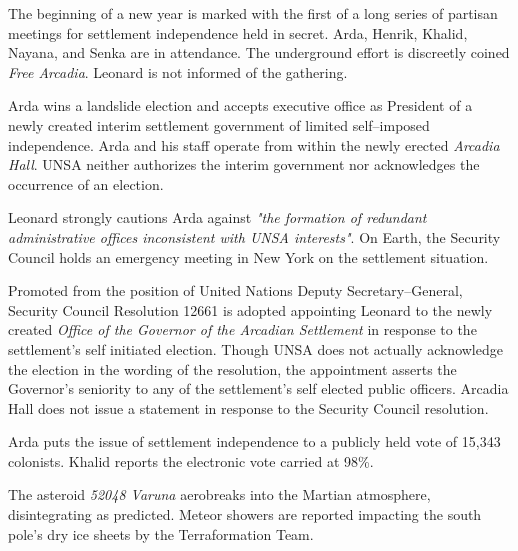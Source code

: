 

The beginning of a new year is marked with the first of a long series of partisan meetings for settlement independence held in secret. Arda, Henrik, Khalid, Nayana, and Senka are in attendance. The underground effort is discreetly coined {\it Free Arcadia}. Leonard is not informed of the gathering.
\StopTimelineDate

Arda wins a landslide election and accepts executive office as President of a newly created interim settlement government of limited self--imposed independence. Arda and his staff operate from within the newly erected {\it Arcadia Hall}. UNSA neither authorizes the interim government nor acknowledges the occurrence of an election.

Leonard strongly cautions Arda against {\it "the formation of redundant administrative offices inconsistent with UNSA interests"}. On Earth, the Security Council holds an emergency meeting in New York on the settlement situation.
\StopTimelineDate

Promoted from the position of United Nations Deputy Secretary--General, Security Council Resolution 12661 is adopted appointing Leonard to the newly created {\it Office of the Governor of the Arcadian Settlement} in response to the settlement's self initiated election. Though UNSA does not actually acknowledge the election in the wording of the resolution, the appointment asserts the Governor's seniority to any of the settlement's self elected public officers. Arcadia Hall does not issue a statement in response to the Security Council resolution.
\StopTimelineDate

Arda puts the issue of settlement independence to a publicly held vote of 15,343 colonists. Khalid reports the electronic vote carried at 98\%.
\StopTimelineDate

The asteroid {\it 52048 Varuna} aerobreaks into the Martian atmosphere, disintegrating as predicted. Meteor showers are reported impacting the south pole's dry ice sheets by the Terraformation Team.
\StopTimelineDate

